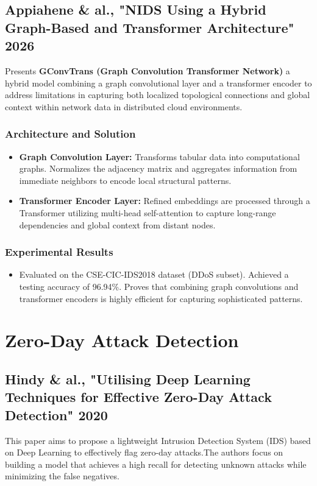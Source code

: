 \documentclass[12pt, a4paper]{report}
\begin{document}
\subsection{Appiahene \& al., "NIDS Using a Hybrid Graph-Based and Transformer Architecture" 2026}
\cite{appiahene2026network} Presents \textbf{GConvTrans (Graph Convolution Transformer Network)} a hybrid model combining a graph convolutional layer and a transformer encoder to address limitations in capturing both localized topological connections and global context within network data in distributed cloud environments.

\subsubsection{Architecture and Solution}
\begin{itemize}
    \item \textbf{Graph Convolution Layer:} Transforms tabular data into computational graphs. Normalizes the adjacency matrix and aggregates information from immediate neighbors to encode local structural patterns.
    \item \textbf{Transformer Encoder Layer:} Refined embeddings are processed through a Transformer utilizing multi-head self-attention to capture long-range dependencies and global context from distant nodes.
\end{itemize}

\subsubsection{Experimental Results}
\begin{itemize}
    \item Evaluated on the CSE-CIC-IDS2018 dataset (DDoS subset). Achieved a testing accuracy of 96.94\%. Proves that combining graph convolutions and transformer encoders is highly efficient for capturing sophisticated patterns.
\end{itemize}



\section{Zero-Day Attack Detection}

\subsection{Hindy \& al., "Utilising Deep Learning Techniques for Effective Zero-Day Attack Detection" 2020}
This paper \cite{hindy2020utilisingzeroday} aims to propose a lightweight Intrusion Detection System (IDS) based on Deep Learning to effectively flag zero-day attacks.The authors focus on building a model that achieves a high recall for detecting unknown attacks while minimizing the false negatives.
\end{document}
